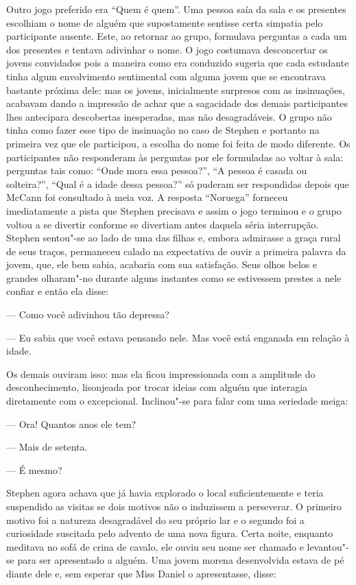 Outro jogo preferido era “Quem é quem”.  Uma pessoa saía da sala e
os presentes escolhiam o nome de alguém que supostamente sentisse certa
simpatia pelo participante ausente.  Este, ao retornar ao grupo,
formulava perguntas a cada um dos presentes e tentava adivinhar o nome.
O jogo costumava desconcertar os jovens convidados pois a maneira como
era conduzido sugeria que cada estudante tinha algum envolvimento
sentimental com alguma jovem que se encontrava bastante próxima dele:
mas os jovens, inicialmente surpresos com as insinuações, acabavam
dando a impressão de achar que a sagacidade dos demais participantes
lhes antecipara descobertas inesperadas, mas não desagradáveis.  O
grupo não tinha como fazer esse tipo de insinuação no caso de Stephen e
portanto na primeira vez que ele participou, a escolha do nome foi
feita de modo diferente.  Os participantes não responderam às
perguntas por ele formuladas ao voltar à sala: perguntas tais como:
“Onde mora essa pessoa?”, “A pessoa é casada ou solteira?”, “Qual é a
idade dessa pessoa?” só puderam ser respondidas depois que McCann foi
consultado à meia voz.  A resposta “Noruega” forneceu imediatamente a
pista que Stephen precisava e assim o jogo terminou e o grupo voltou a
se divertir conforme se divertiam antes daquela séria interrupção.
Stephen sentou"-se ao lado de uma das filhas e, embora admirasse a graça
rural de seus traços, permaneceu calado na expectativa de ouvir a
primeira palavra da jovem, que, ele bem sabia, acabaria com sua
satisfação.  Seus olhos belos e grandes olharam"-no durante alguns
instantes como se estivessem \label{prestes"-a} prestes a nele confiar e então ela
disse:

--- Como você adivinhou tão depressa?

--- Eu sabia que você estava pensando nele.  Mas você está
enganada em relação à idade.

Os demais ouviram isso: mas ela ficou impressionada com a amplitude
do desconhecimento, lisonjeada por trocar ideias com alguém que
interagia diretamente com o excepcional.  Inclinou"-se para falar com
uma seriedade meiga:

--- Ora!  Quantos anos ele tem?

--- Mais de setenta.

--- É mesmo?

Stephen agora achava que já havia explorado o local suficientemente
e teria suspendido as visitas se dois motivos não o induzissem a
perseverar.  O primeiro motivo foi a natureza desagradável do seu
próprio lar e o segundo foi a curiosidade suscitada pelo advento de uma
nova figura.  Certa noite, enquanto meditava no sofá de crina de cavalo,
ele ouviu seu nome ser chamado e levantou"-se para ser apresentado a
alguém.  Uma jovem morena \label{desenvolvida} desenvolvida estava de pé diante dele e,
sem esperar que Miss Daniel o apresentasse, disse:

